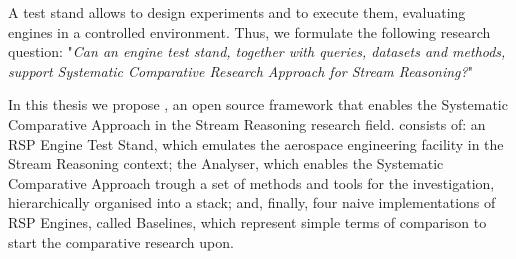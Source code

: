 A test stand allows to design experiments and to execute them, evaluating engines in a controlled environment. Thus, we formulate the following research question: "\textit{Can an engine test stand, together with queries, datasets and methods, support Systematic Comparative Research Approach for Stream Reasoning?}"

In this thesis we propose \namens, an open source framework that enables the Systematic Comparative Approach in the Stream Reasoning research field. \name consists of:  an RSP Engine Test Stand, which emulates the aerospace engineering facility in the Stream Reasoning context; the Analyser, which enables the Systematic Comparative Approach trough a set of methods and tools for the investigation, hierarchically organised into a stack; and, finally, four naive implementations of RSP Engines, called Baselines, which represent simple terms of comparison to start the comparative research upon.